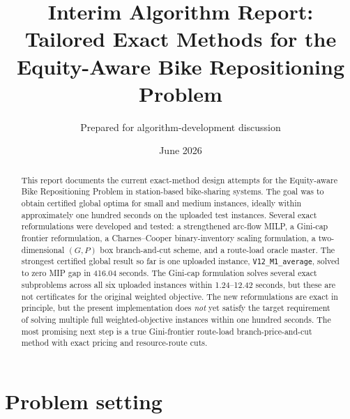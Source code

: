\documentclass[11pt]{article}
\title{Interim Algorithm Report: Tailored Exact Methods for the Equity-Aware Bike Repositioning Problem}
\author{Prepared for algorithm-development discussion}
\date{June 2026}
\begin{document}
\maketitle

\begin{abstract}
This report documents the current exact-method design attempts for the Equity-aware Bike Repositioning Problem in station-based bike-sharing systems.  The goal was to obtain certified global optima for small and medium instances, ideally within approximately one hundred seconds on the uploaded test instances.  Several exact reformulations were developed and tested: a strengthened arc-flow MILP, a Gini-cap frontier reformulation, a Charnes--Cooper binary-inventory scaling formulation, a two-dimensional $(G,P)$ box branch-and-cut scheme, and a route-load oracle master.  The strongest certified global result so far is one uploaded instance, \texttt{V12\_M1\_average}, solved to zero MIP gap in 416.04 seconds.  The Gini-cap formulation solves several exact subproblems across all six uploaded instances within 1.24--12.42 seconds, but these are not certificates for the original weighted objective.  The new reformulations are exact in principle, but the present implementation does \emph{not} yet satisfy the target requirement of solving multiple full weighted-objective instances within one hundred seconds.  The most promising next step is a true Gini-frontier route-load branch-price-and-cut method with exact pricing and resource-route cuts.
\end{abstract}

\section{Problem setting}
\end{document}

